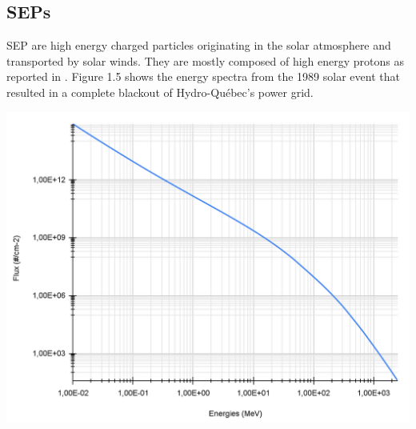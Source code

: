 \documentclass[12pt,a4paper]{report}
\begin{document}
\newpage
\begin{minipage}[b]{0.35\linewidth}
\subsection{SEPs}
SEP are high energy charged particles originating in the solar atmosphere and transported by solar winds. They are mostly composed of high energy protons as reported in \citet{jiggens2019}. Figure 1.5 shows the energy spectra from the 1989 solar event that resulted in a complete blackout of Hydro-Québec's power grid.
\end{minipage}
\hfill
\begin{minipage}[b]{0.5\linewidth}
\centering
\includegraphics[width=1\textwidth]{img/proton flux 1989.png}
\end{minipage} \\
\hfill\\
\end{document}
